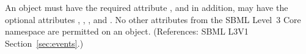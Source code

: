 An \Event object must have the required attribute
, and in addition, may have the optional
attributes , , , and .
No other attributes from the SBML Level~3 Core namespace are permitted on
an \Event object.  (References: SBML L3V1 Section~\ref{sec:events}.)
